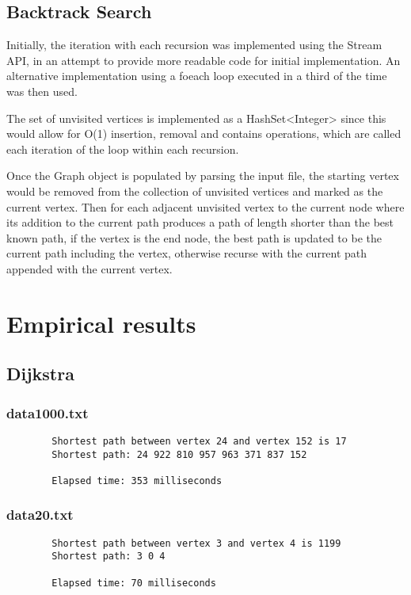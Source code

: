 \documentclass{article}
\begin{document}
    \subsection*{Backtrack Search}

    Initially, the iteration with each recursion was implemented using the Stream API, in an attempt to provide more
    readable code for initial implementation.
    An alternative implementation using a foeach loop executed in a third of the time was then used.

    The set of unvisited vertices is implemented as a HashSet<Integer> since this would allow for O(1) insertion, removal
    and contains operations, which are called each iteration of the loop within each recursion.

    Once the Graph object is populated by parsing the input file, the starting vertex would be removed from the collection
    of unvisited vertices and marked as the current vertex.
    Then for each adjacent unvisited vertex to the current node where its addition to the current path produces a path of
    length shorter than the best known path, if the vertex is the end node, the best path is updated to be the current path
    including the vertex, otherwise recurse with the current path appended with the current vertex.

    \section*{Empirical results}

    \subsection*{Dijkstra}
    \subsubsection*{data1000.txt}
    \begin{verbatim}
        Shortest path between vertex 24 and vertex 152 is 17
        Shortest path: 24 922 810 957 963 371 837 152

        Elapsed time: 353 milliseconds
    \end{verbatim}

    \subsubsection*{data20.txt}
    \begin{verbatim}
        Shortest path between vertex 3 and vertex 4 is 1199
        Shortest path: 3 0 4

        Elapsed time: 70 milliseconds
    \end{verbatim}
\end{document}
